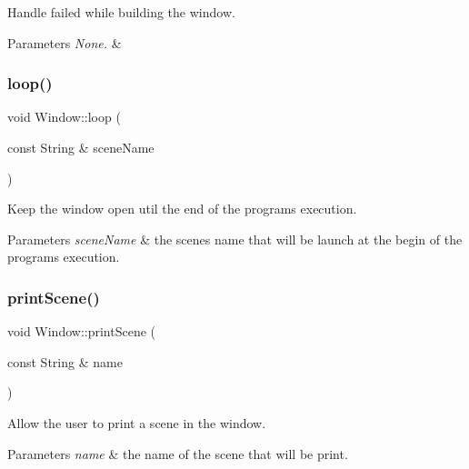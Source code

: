 Handle failed while building the window. 


\begin{DoxyParams}{Parameters}
{\em None.} & \\
\hline
\end{DoxyParams}
\mbox{\label{classWindow_a9c9f1fd6ebc2b93f16ca870487a4a4c6}} 
\subsubsection{\texorpdfstring{loop()}{loop()}}
{\footnotesize\ttfamily void Window\+::loop (\begin{DoxyParamCaption}\item[{const String \&}]{scene\+Name }\end{DoxyParamCaption})}



Keep the window open util the end of the program\textquotesingle{}s execution. 


\begin{DoxyParams}{Parameters}
{\em \textquotesingle{}scene\+Name\textquotesingle{}} & the scene\textquotesingle{}s name that will be launch at the begin of the program\textquotesingle{}s execution. \\
\hline
\end{DoxyParams}
\mbox{\label{classWindow_a9e73c1dc8b22cdf16e6446af6f7ade48}} 
\subsubsection{\texorpdfstring{print\+Scene()}{printScene()}}
{\footnotesize\ttfamily void Window\+::print\+Scene (\begin{DoxyParamCaption}\item[{const String \&}]{name }\end{DoxyParamCaption})}



Allow the user to print a scene in the window. 


\begin{DoxyParams}{Parameters}
{\em \textquotesingle{}name\textquotesingle{}} & the name of the scene that will be print. \\
\hline
\end{DoxyParams}
\mbox{\label{classWindow_a3342dc02339a5974d5c6fcefd91d0cbf}} 
